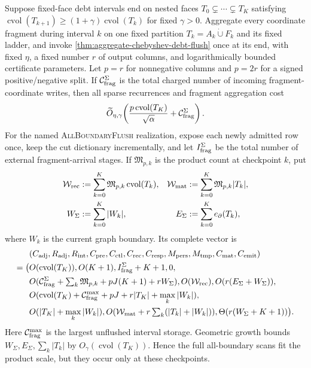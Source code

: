 \begin{corollary}
\label{cor:geometric-aggregate-debt-flush}
Suppose fixed-face debt intervals end on nested faces
$T_0\subsetneq\cdots\subsetneq T_K$ satisfying
$\operatorname{cvol}(T_{k+1})\geq
(1+\gamma)\operatorname{cvol}(T_k)$ for fixed $\gamma>0$.  Aggregate every
coordinate fragment during interval $k$ on one fixed partition
$T_k=A_k\mathbin{\dot\cup}F_k$ and its fixed ladder, and invoke
\cref{thm:aggregate-chebyshev-debt-flush} once at its end, with fixed
$\eta$, a fixed number $r$ of output columns, and logarithmically bounded
certificate parameters.  Let $p=r$ for nonnegative columns and $p=2r$ for a
signed positive/negative split.  If $\mathcal C_{\rm frag}^{\Sigma}$ is the
total charged number of incoming fragment-coordinate writes, then all sparse
recurrences and fragment aggregation cost
\begin{equation}
 \widetilde O_{\eta,\gamma}\!\left(
  \frac{p\operatorname{cvol}(T_K)}{\sqrt\alpha}
  +\mathcal C_{\rm frag}^{\Sigma}
 \right).
 \label{eq:geometric-aggregate-debt-flush-work}
\end{equation}
For the named \textsc{AllBoundaryFlush} realization, expose each newly
admitted row once, keep the cut dictionary incrementally, and let
$I_{\rm frag}^{\Sigma}$ be the total number of external fragment-arrival
stages.  If $\mathfrak M_{p,k}$ is the product count at checkpoint $k$, put
\begin{align*}
 \mathcal W_{\rm rec}
 &:=\sum_{k=0}^K\mathfrak M_{p,k}\operatorname{cvol}(T_k),
 &\mathcal W_{\rm mat}
 &:=\sum_{k=0}^K\mathfrak M_{p,k}|T_k|,\\
 W_\Sigma&:=\sum_{k=0}^K|W_k|,
 &E_\Sigma&:=\sum_{k=0}^Ke_\partial(T_k),
\end{align*}
where $W_k$ is the current graph boundary.  Its complete vector is
\begin{equation}
 \begin{aligned}
 &(C_{\rm adj},R_{\rm adj},R_{\rm int},C_{\rm pre},C_{\rm ctl},C_{\rm rec},
 C_{\rm resp},M_{\rm pers},M_{\rm tmp},C_{\rm mat},C_{\rm emit})\\
 =\bigl(&O(\operatorname{cvol}(T_K)),O(K+1),
 I_{\rm frag}^{\Sigma}+K+1,0,\\
 &O(\mathcal C_{\rm frag}^{\Sigma}
      +\textstyle\sum_k\mathfrak M_{p,k}+pJ(K+1)+rW_\Sigma),
 O(\mathcal W_{\rm rec}),O(r(E_\Sigma+W_\Sigma)),\\
 &O(\operatorname{cvol}(T_K)+\mathcal C_{\rm frag}^{\max}
       +pJ+r|T_K|+\max_k|W_k|),\\
 &O(|T_K|+\max_k|W_k|),
 O(\mathcal W_{\rm mat}+r\textstyle\sum_k(|T_k|+|W_k|)),
 \Theta(r(W_\Sigma+K+1))\bigr).
 \end{aligned}
 \label{eq:geometric-aggregate-debt-eleven-vector}
\end{equation}
Here $\mathcal C_{\rm frag}^{\max}$ is the largest unflushed interval
storage.  Geometric growth bounds
$W_\Sigma,E_\Sigma,\sum_k|T_k|$ by
$O_\gamma(\operatorname{cvol}(T_K))$.  Hence the full all-boundary scans fit
the product scale, but they occur only at these checkpoints.


\end{corollary}

